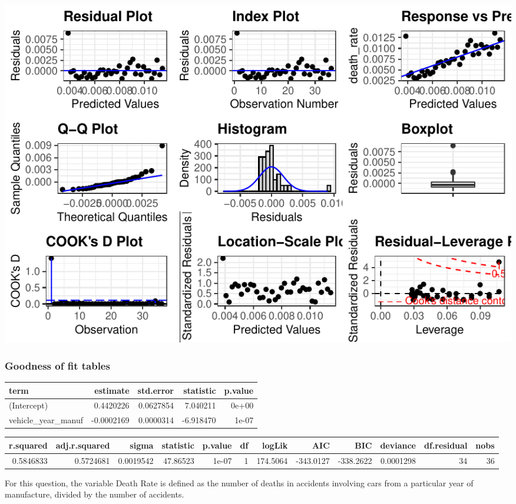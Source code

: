 \documentclass[11pt,a4paper,]{article}
\begin{document}
\includegraphics{Report_files/figure-latex/regression-model-1.pdf}

\subsubsection*{Goodness of fit tables}

\begin{table}
\centering
\begin{tabular}{l|r|r|r|r}
\hline
term & estimate & std.error & statistic & p.value\\
\hline
(Intercept) & 0.4420226 & 0.0627854 & 7.040211 & 0e+00\\
\hline
vehicle\_year\_manuf & -0.0002169 & 0.0000314 & -6.918470 & 1e-07\\
\hline
\end{tabular}
\end{table}

\begin{table}
\centering
\begin{tabular}{r|r|r|r|r|r|r|r|r|r|r|r}
\hline
r.squared & adj.r.squared & sigma & statistic & p.value & df & logLik & AIC & BIC & deviance & df.residual & nobs\\
\hline
0.5846833 & 0.5724681 & 0.0019542 & 47.86523 & 1e-07 & 1 & 174.5064 & -343.0127 & -338.2622 & 0.0001298 & 34 & 36\\
\hline
\end{tabular}
\end{table}

For this question, the variable Death Rate is defined as the number of deaths in accidents involving cars from a particular year of manufacture, divided by the number of accidents.
\end{document}

